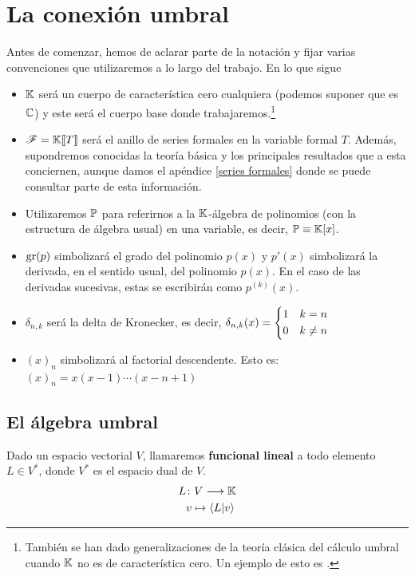 \chapter{La conexión umbral}

Antes de comenzar, hemos de aclarar parte de la notación y fijar varias convenciones que utilizaremos a lo largo del trabajo. En lo que sigue
\begin{itemize}
    \item $\mathbb{K}$ será un cuerpo de característica cero cualquiera (podemos suponer que es $\mathbb{C}$) y este será el cuerpo base donde trabajaremos.\footnote{También se han dado generalizaciones de la teoría clásica del cálculo umbral cuando $\mathbb{K}$ no es de característica cero. Un ejemplo de esto es \cite{verdoodt}.}
    \item $\mathscr{F} = \mathbb{K} \llbracket T \rrbracket$ será el anillo de series formales en la variable formal $T$. Además, supondremos conocidas la teoría básica y los principales resultados que a esta conciernen, aunque damos el apéndice \ref{series formales} donde se puede consultar parte de esta información.
    \item Utilizaremos $\mathbb{P}$ para referirnos a la $\mathbb{K}$-álgebra de polinomios (con la estructura de álgebra usual) en una variable, es decir, $\mathbb{P} \equiv \mathbb{K}[x]$.
    \item $\operatorname{gr}(p)$ simbolizará el grado del polinomio $p(x)$ y $p'(x)$ simbolizará la derivada, en el sentido usual, del polinomio $p(x)$. En el caso de las derivadas sucesivas, estas se escribirán como $p^{(k)}(x)$.
    \item $\delta_{n,k}$ será la delta de Kronecker, es decir,
        $\delta_{n,k} (x) = \begin{dcases}
            1 & k=n\\
            0 & k \neq n
        \end{dcases} $
    \item $(x)_n$ simbolizará al factorial descendente. Esto es: $(x)_n = x(x-1) \cdots (x-n+1)$
\end{itemize}

\section{El álgebra umbral}
\begin{definicion}
    Dado un espacio vectorial $V$, llamaremos \textbf{funcional lineal} a todo elemento $L \in V^*$, donde $V^*$ es el espacio dual de $V$.
    \begin{align*}
        L &\colon V \longrightarrow \mathbb{K}\\
        &v \mapsto \langle L | v\rangle
    \end{align*}
\end{definicion}

